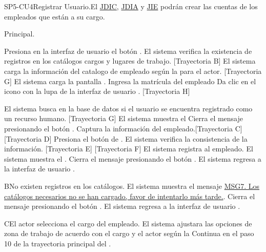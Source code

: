\begin{UseCase}{SP5-CU4}{Registrar Usuario.}{El \hyperlink{JDIC}{JDIC}, \hyperlink{JDIA}{JDIA} y  \hyperlink{JIE}{JIE} podrán crear las cuentas de los empleados que están a su cargo. }
\end{UseCase}

\begin{UCtrayectoria}{Principal.}
    
  \UCpaso[\UCactor] Presiona en la interfaz de usuario  el botón \IUbutton{+}.
    \UCpaso  El sistema verifica la existencia de registros en los catálogos cargos  y  lugares de trabajo. [Trayectoria B] 
    \UCpaso El sistema carga la información del catalogo de empleado  según la  para el actor. [Trayectoria G]
    \UCpaso El sistema carga la pantalla  .
    \UCpaso[\UCactor] Ingresa la matrícula del empleado 
    \UCpaso[\UCactor] Da clic en el icono con la lupa de la interfaz de usuario . [Trayectoria H]
    
    \UCpaso El sistema busca en la base de datos si el usuario se encuentra registrado como un recurso humano. [Trayectoria G]
    \UCpaso El sistema muestra el 
    \UCpaso[\UCactor] Cierra el mensaje presionando el botón .
    \UCpaso[\UCactor]
    Captura la información del empleado.[Trayectoria C] [Trayectoria D] 
    \UCpaso[\UCactor]  Presiona el botón de .
    \UCpaso El sistema verifica la consistencia de la información. [Trayectoria E] [Trayectoria F]
    \UCpaso El sistema registra al empleado.
    \UCpaso  El sistema muestra el .    
    \UCpaso[\UCactor] Cierra el mensaje presionando el botón .
    \UCpaso El sistema regresa a la interfaz de usuario .
\end{UCtrayectoria}


\begin{UCtrayectoriaA}{B}{No existen registros en los catálogos.}
    \UCpaso El sistema muestra el mensaje \hyperref[MSG7]{MSG7. Los catálogos necesarios no se han cargado, favor de intentarlo más tarde.}.
	\UCpaso[\UCactor] Cierra el mensaje presionando el botón .
     \UCpaso El sistema regresa a la interfaz de usuario .
\end{UCtrayectoriaA}

\begin{UCtrayectoriaA}{C}{El actor selecciona el cargo del empleado.}
    \UCpaso     El sistema ajustara las opciones de zona de trabajo de acuerdo con el cargo y el actor según la 
    \UCpaso Continua en el paso 10 de la trayectoria principal del .
\end{UCtrayectoriaA}

